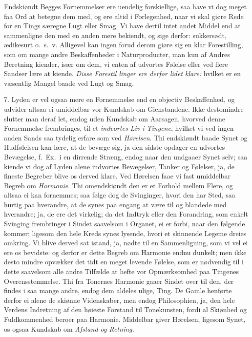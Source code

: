 \documentclass[12pt,a4paper]{article}
\newcommand{\opage}[1]{\marginnote{\footnotesize\textit{[#1]}}}
\begin{document}
Endskiøndt Begges Fornemmelser ere uendelig forskiellige, saa have vi dog meget faa Ord
at betegne dem med, og ere altid i Forlegenhed, naar vi skal giøre Rede for en Tings
særegne Lugt eller Smag. Vi have dertil intet andet Middel end at sammenligne den med
en anden mere bekiendt, og sige derfor: sukkersødt, ædikesurt o.~s.~v. Alligevel kan
ingen forud derom giøre sig en klar Forestilling, som om mange andre Beskaffenheder i
Naturproducter, man kun af Andres Beretning kiender, især om dem, vi enten af udvortes
Følelse eller ved flere Sandser lære at kiende. \emph{Disse Forestil%
\opage{68}linger ere derfor lidet klare:} hvilket er en væsentlig Mangel baade ved Lugt og Smag.

7. Lyden er vel ogsaa mere en Fornemmelse end en objectiv Beskaffenhed, og udvider
altsaa ei umiddelbar vor Kundskab om Gienstandene. Ikke destomindre slutter man deraf
let, endog uden Kundskab om Aarsagen, hvorved denne Fornemmelse frembringes, til et
\emph{indvortes Liv i Tingene}, hvilket vi ved ingen anden Sands saa tydelig erfare som
ved \emph{Hørelsen}. Thi endskiøndt baade Synet og Hudfølelsen kan lære, at de bevæge
sig, ja den sidste opdager en udvortes Bevægelse, f.~Ex.\ i en dirrende Stræng, endog
naar den undgaaer Synet selv; saa kiende vi dog af Lyden alene indvortes Bevægelser,
Tanker og Følelser, ja, de fineste Begreber blive os derved klare. Ved Hørelsen faae vi
fast umiddelbar Begreb om \emph{Harmonie}. Thi omendskiøndt den er et Forhold mellem
Flere, og altsaa ei kan fornemmes; saa følge dog de Svinginger, hvori den har Sted, saa
hurtig paa hverandre, at de synes paa engang at være til og blandede med hverandre; ja,
de ere det virkelig; da det Indtryk eller den Forandring, som enkelt Svinging
frembringer i Sindet saavelsom i Organet, ei er forbi, naar den følgende kommer;
ligesom den hele Kreds synes lysende, hvori et skinnende Legeme dreies omkring. Vi
blive derved sat istand, ja, nødte til en Sammenligning, som vi vel ei ere os bevidste:
og derfor er dette Begreb om Harmonie endnu dunkelt; men
\opage{69} ikke desto mindre opvækker det tidt en meget levende Følelse, som er nødvendig til i
dette saavelsom alle andre Tilfælde at hefte vor Opmærksomhed paa Tingenes
Overensstemmelse. Thi fra Tonernes Harmonie gaaer Sindet over til den, der findes i saa
mange andre, endog dem aldeles ulige, Ting. De Gamle henførte derfor ei alene de
skiønne Videnskaber, men endog Philosophien, ja, den hele Verdens Indretning af den
høieste Forstand til Tonekunsten, fordi al Skiønhed og Fuldkommenhed beroer paa
Harmonie. Middelbar giver Hørelsen, ligesom Synet, os ogsaa Kundskab om \emph{Afstand
og Retning.}
\end{document}
